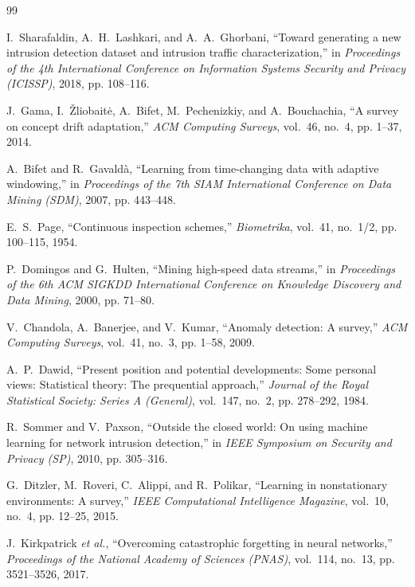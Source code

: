 \documentclass[12pt,a4paper,oneside]{report}
\begin{document}
\begin{thebibliography}{99}

I.~Sharafaldin, A.~H.~Lashkari, and A.~A.~Ghorbani, ``Toward generating a new intrusion detection dataset and intrusion traffic characterization,'' in \textit{Proceedings of the 4th International Conference on Information Systems Security and Privacy (ICISSP)}, 2018, pp. 108--116.

J.~Gama, I.~{\v{Z}}liobait{\.e}, A.~Bifet, M.~Pechenizkiy, and A.~Bouchachia, ``A survey on concept drift adaptation,'' \textit{ACM Computing Surveys}, vol.~46, no.~4, pp. 1--37, 2014.

A.~Bifet and R.~Gavald{\`a}, ``Learning from time-changing data with adaptive windowing,'' in \textit{Proceedings of the 7th SIAM International Conference on Data Mining (SDM)}, 2007, pp. 443--448.

E.~S.~Page, ``Continuous inspection schemes,'' \textit{Biometrika}, vol.~41, no.~1/2, pp. 100--115, 1954.

P.~Domingos and G.~Hulten, ``Mining high-speed data streams,'' in \textit{Proceedings of the 6th ACM SIGKDD International Conference on Knowledge Discovery and Data Mining}, 2000, pp. 71--80.

V.~Chandola, A.~Banerjee, and V.~Kumar, ``Anomaly detection: A survey,'' \textit{ACM Computing Surveys}, vol.~41, no.~3, pp. 1--58, 2009.

A.~P.~Dawid, ``Present position and potential developments: Some personal views: Statistical theory: The prequential approach,'' \textit{Journal of the Royal Statistical Society: Series A (General)}, vol.~147, no.~2, pp. 278--292, 1984.

R.~Sommer and V.~Paxson, ``Outside the closed world: On using machine learning for network intrusion detection,'' in \textit{IEEE Symposium on Security and Privacy (SP)}, 2010, pp. 305--316.

G.~Ditzler, M.~Roveri, C.~Alippi, and R.~Polikar, ``Learning in nonstationary environments: A survey,'' \textit{IEEE Computational Intelligence Magazine}, vol.~10, no.~4, pp. 12--25, 2015.

J.~Kirkpatrick \textit{et al.}, ``Overcoming catastrophic forgetting in neural networks,'' \textit{Proceedings of the National Academy of Sciences (PNAS)}, vol.~114, no.~13, pp. 3521--3526, 2017.


\end{thebibliography}
\end{document}
